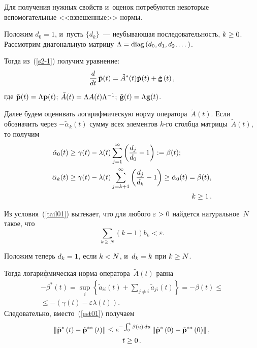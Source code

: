 \begin{multicols}{2}
Для получения нужных свойств и~оценок потребуются некоторые вспомогательные <<взвешенные>> нормы.

Положим $d_0=1$, и~пусть $\{d_k\}$~--- неубывающая последовательность, $k\hm \ge 0$.
Рассмотрим диагональную мат\-ри\-цу
$\Lambda \hm= \mathrm{diag}\left(d_0, d_1, d_2, \dots  \right)$.

Тогда из~(\ref{s2-1}) получим уравнение:
\begin{equation}
\label{1.03}
\displaystyle\frac{\displaystyle d\mathstrut}{\displaystyle dt\mathstrut}\,\tilde{\mathbf{p}}(t)=\tilde{A}^*(t)\tilde{\mathbf{p}}(t) + {\tilde{\bf g}}\left(t\right),
\end{equation}
где $\tilde{\mathbf{p}}(t)\hm=\Lambda \mathbf{p}(t)$; $\tilde{A}(t)\hm=\Lambda A(t) \Lambda^{-1}$;
${\tilde{\bf g}}(t) \hm= \Lambda{\bf g}(t)$.

Далее будем оценивать логарифмическую норму оператора~$\tilde{A}(t)$.
Если обозначить через $-\tilde{\alpha}_k(t)$ сумму всех элементов $k$-го столбца 
матрицы~$\tilde{A}(t)$, то получим
\begin{align*}
\tilde{\alpha}_0(t) &\ge \gamma(t) -
\lambda(t)\sum\limits_{j=1}^{\infty}\left(\fr{d_j}{d_0}-1\right):=\beta(t);
\\
\tilde{\alpha}_k(t)& \ge \gamma(t) -\lambda(t)\sum\limits_{j=k+1}^{\infty}\left(
\fr{d_j}{d_k}-1\right) \ge \tilde{\alpha}_0(t)=\beta(t),\\
&\hspace*{61mm}k \ge 1\,.
\end{align*}

Из условия~(\ref{tail01}) вытекает, что для любого $\varepsilon \hm>0$ найдется натуральное~$N$ такое, что
\begin{equation*}
\sum\limits_{k \ge N} \left(k-1\right) b_k < \varepsilon. 
\end{equation*}


Положим теперь $d_k\hm=1$, если $k\hm <N$, и~$d_k\hm=k$ при $k \hm\ge N$.


Тогда логарифмическая норма оператора~$\tilde{A}(t)$ равна
\begin{multline*}
-\beta^* (t)=  \sup\limits_i \left \{ \tilde{a}_{ii}(t) + \sum\limits_{j\neq     i}
\tilde{a}_{ji}(t)\right \} =  - \beta(t) \le{}\\
{}\le  -\left(\gamma(t) - \varepsilon \lambda(t)\right).
\end{multline*}
Следовательно, вместо~(\ref{est01}) получаем
\begin{multline*}
\hspace*{-0.48921pt}\left\|{\tilde{\mathbf{p}}}^{*}\left(t\right)-
{\tilde{\mathbf{p}}}^{**}\left(t\right)\right\|\le e^{-\int\nolimits_0^t \beta\left(u\right)\, du}
\left\|{\tilde{\mathbf{p}}}^{*}\left(0\right)-{\tilde{\mathbf{p}}}^{**}
\left(0\right)\right\|, \\
 t \ge 0\,. 
\end{multline*}


\end{multicols}
